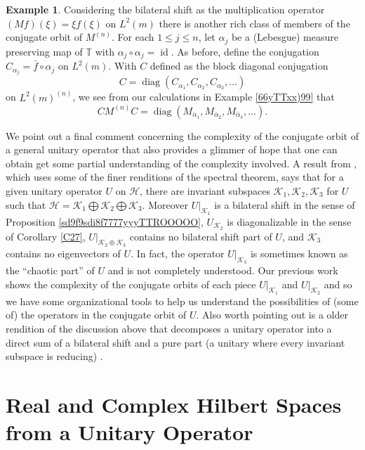 \documentclass{dis}
\theoremstyle{plain}
\theoremstyle{definition}
\newtheorem{Example}[equation]{Example}
\def\T{\mathbb{T}}
\renewcommand{\leq}{\leqslant}
\newcommand{\0}{{\color{lightgray}0}}
\begin{document}
\begin{Example}
Considering the bilateral shift as the multiplication operator $(M f)(\xi) = \xi f(\xi)$ on $L^2(m)$ there is another rich class of members of the conjugate orbit of $M^{(n)}$. For each  $1 \leq j \leq n$, let $\alpha_j$ be a (Lebesgue) measure preserving map of $\T$ with $\alpha_j \circ \alpha_j = \operatorname{id}$. As before, define the conjugation $C_{\alpha_j} = \bar f \circ \alpha_j$ on $L^2(m)$. With $C$ defined as the block diagonal conjugation 
$$C = \operatorname{diag}(C_{\alpha_1}, C_{\alpha_2}, C_{\alpha_3}, \ldots)$$ on $L^2(m)^{(n)}$, we see from our calculations in Example \ref{66yTTxx)99} that 
$$C M^{(n)} C = \operatorname{diag}(M_{\bar \alpha_1}, M_{\bar \alpha_2}, M_{\bar \alpha_3}, \ldots).$$
\end{Example}



We point out a  final comment concerning the complexity of the conjugate orbit of a general unitary operator that also provides a glimmer of hope that one can obtain get some partial understanding of the complexity involved.  A  result from \cite{MR4866296}, which uses some of the finer renditions of the spectral theorem,  says that for a given unitary operator $U$ on $\mathcal{H}$, there are invariant subspaces $\mathcal{K}_{1}, \mathcal{K}_{2}, \mathcal{K}_{3}$ for $U$ such that $\mathcal{H} = \mathcal{K}_{1} \bigoplus \mathcal{K}_{2} \bigoplus \mathcal{K}_{3}$. Moreover $U|_{\mathcal{K}_1}$ is a bilateral shift in the sense of Proposition \ref{sd9f9sdi8f7777yyyTTROOOOO}, $U_{\mathcal{K}_2}$ is diagonalizable in the sense of Corollary \ref{C27}, $U|_{\mathcal{K}_{2} \oplus \mathcal{K}_{3}}$ contains no bilateral shift part of $U$, and $\mathcal{K}_{3}$ contains no eigenvectors of $U$. In fact, the operator $U|_{\mathcal{K}_{3}}$ is sometimes known as the ``chaotic part'' of $U$ and is not completely understood. Our previous work shows the complexity of the conjugate orbits of each piece $U|_{\mathcal{K}_1}$ and $U|_{\mathcal{K}_{2}}$ and so we have some organizational tools to help us understand the possibilities of (some of)  the operators in the conjugate orbit of $U$. Also worth pointing out is a older rendition of the discussion above that decomposes a unitary operator into a direct sum of a bilateral shift and a pure part (a unitary where every invariant subspace is reducing) \cite[p.~62-63]{MR270172}. 

\chapter{Real and Complex Hilbert Spaces from a Unitary Operator}
\end{document}
